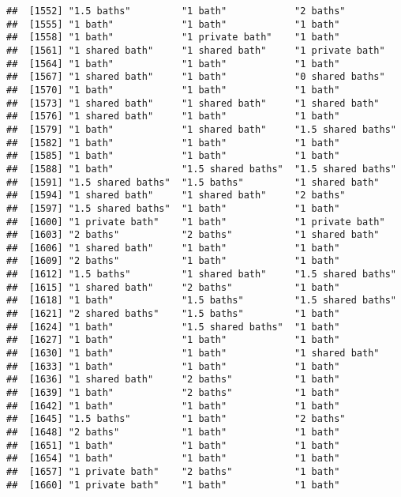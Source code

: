 \documentclass[
]{article}
\begin{document}
\begin{verbatim}
##  [1552] "1.5 baths"         "1 bath"            "2 baths"          
##  [1555] "1 bath"            "1 bath"            "1 bath"           
##  [1558] "1 bath"            "1 private bath"    "1 bath"           
##  [1561] "1 shared bath"     "1 shared bath"     "1 private bath"   
##  [1564] "1 bath"            "1 bath"            "1 bath"           
##  [1567] "1 shared bath"     "1 bath"            "0 shared baths"   
##  [1570] "1 bath"            "1 bath"            "1 bath"           
##  [1573] "1 shared bath"     "1 shared bath"     "1 shared bath"    
##  [1576] "1 shared bath"     "1 bath"            "1 bath"           
##  [1579] "1 bath"            "1 shared bath"     "1.5 shared baths" 
##  [1582] "1 bath"            "1 bath"            "1 bath"           
##  [1585] "1 bath"            "1 bath"            "1 bath"           
##  [1588] "1 bath"            "1.5 shared baths"  "1.5 shared baths" 
##  [1591] "1.5 shared baths"  "1.5 baths"         "1 shared bath"    
##  [1594] "1 shared bath"     "1 shared bath"     "2 baths"          
##  [1597] "1.5 shared baths"  "1 bath"            "1 bath"           
##  [1600] "1 private bath"    "1 bath"            "1 private bath"   
##  [1603] "2 baths"           "2 baths"           "1 shared bath"    
##  [1606] "1 shared bath"     "1 bath"            "1 bath"           
##  [1609] "2 baths"           "1 bath"            "1 bath"           
##  [1612] "1.5 baths"         "1 shared bath"     "1.5 shared baths" 
##  [1615] "1 shared bath"     "2 baths"           "1 bath"           
##  [1618] "1 bath"            "1.5 baths"         "1.5 shared baths" 
##  [1621] "2 shared baths"    "1.5 baths"         "1 bath"           
##  [1624] "1 bath"            "1.5 shared baths"  "1 bath"           
##  [1627] "1 bath"            "1 bath"            "1 bath"           
##  [1630] "1 bath"            "1 bath"            "1 shared bath"    
##  [1633] "1 bath"            "1 bath"            "1 bath"           
##  [1636] "1 shared bath"     "2 baths"           "1 bath"           
##  [1639] "1 bath"            "2 baths"           "1 bath"           
##  [1642] "1 bath"            "1 bath"            "1 bath"           
##  [1645] "1.5 baths"         "1 bath"            "2 baths"          
##  [1648] "2 baths"           "1 bath"            "1 bath"           
##  [1651] "1 bath"            "1 bath"            "1 bath"           
##  [1654] "1 bath"            "1 bath"            "1 bath"           
##  [1657] "1 private bath"    "2 baths"           "1 bath"           
##  [1660] "1 private bath"    "1 bath"            "1 bath"           

\end{verbatim}
\end{document}
